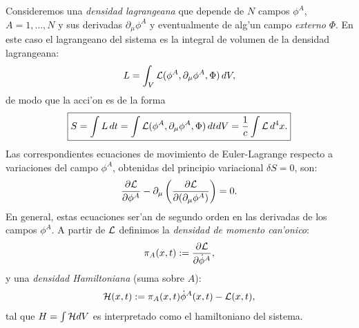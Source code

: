  Consideremos una \textit{densidad lagrangeana} que depende de $N$ campos $\phi^A$,
$A=1,\dots ,N$ y sus derivadas $\partial_\mu \phi^A$ y eventualmente de alg'un
campo {\em externo} $\Phi$. En este caso el lagrangeano del sistema es la
integral de volumen de la densidad lagrangeana:
\begin{equation}
L=\int_V {\cal L}(\phi^A,\partial_\mu\phi^A,\Phi)\, dV ,\label{lag4d}
\end{equation}
de modo que la acci'on es de la forma
\begin{equation}
\boxed{S=\int L\, dt= \int {\cal L}(\phi^A,\partial_\mu\phi^A,\Phi)\, dt dV=
\frac{1}{c}\int {\cal L}\,d^4x.}
\end{equation}
 Las correspondientes ecuaciones de movimiento de Euler-Lagrange respecto a variaciones del campo $\phi^A$, obtenidas del principio variacional $\delta S=0$, son:
\begin{equation}
\frac{\partial {\cal L}}{\partial \phi ^{A}}-\partial _{\mu }\left(
\frac{\partial {\cal L}}{\partial (\partial_{\mu }\phi^{A})}\right)=0.
\label{eccont2}
\end{equation}
En general, estas ecuaciones ser'an de segundo orden en las derivadas de los
campos $\phi^A$. A partir de $\cal L$ definimos la \textit{densidad de momento
can'onico}:
\begin{equation}
\pi_A(x,t)  := \frac{\partial{\cal L}}{\partial\dot{\phi}^A},
\label{DensidadMomentoCanonicoConjugado}
\end{equation}
 y una \textit{densidad Hamiltoniana} (suma sobre $A$):
 \begin{equation}
{\cal H}(x,t) := \pi_A(x,t) \dot{\phi}^A(x,t)-{\cal L}(x,t) ,
\label{DensidadHamiltoniana}
\end{equation}
tal que $H=\int {\cal H}dV$ es interpretado como el hamiltoniano del sistema.


